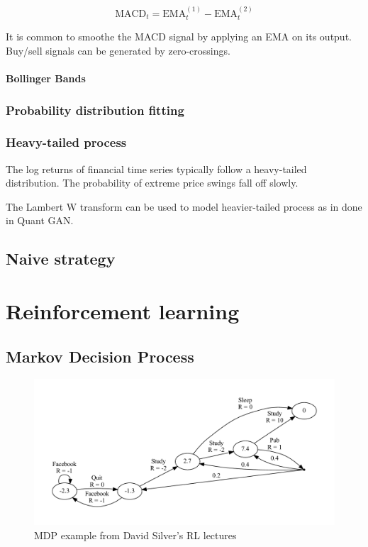 \documentclass[8pt,oneside]{book}
\begin{document}
\begin{equation}
    \mathrm{MACD}_t = \mathrm{EMA}_t^{(1)} - \mathrm{EMA}_t^{(2)}
\end{equation}

It is common to smoothe the MACD signal by applying an EMA on its output. Buy/sell signals can be generated
by zero-crossings.

\subsubsection{Bollinger Bands}

\subsection{Probability distribution fitting}

\subsection{Heavy-tailed process}

The log returns of financial time series typically follow a heavy-tailed distribution. The probability
of extreme price swings fall off slowly.

The Lambert W transform can be used to model heavier-tailed process as in done in Quant GAN.


\section{Naive strategy}

\chapter{Reinforcement learning}

\section{Markov Decision Process}

\begin{figure}
    \center
    \caption{MDP example from David Silver's RL lectures}
    \includegraphics[scale=0.4]{mdp}
\end{figure}
\end{document}
